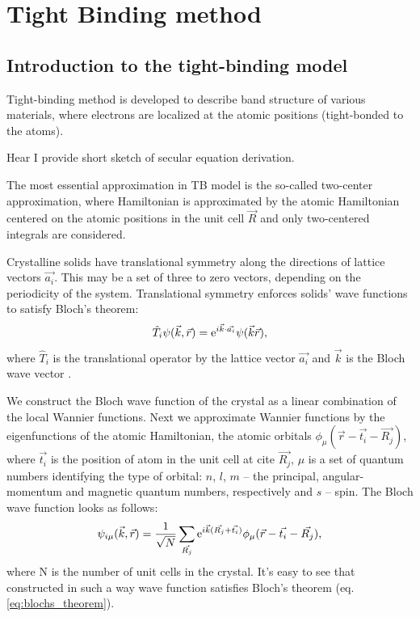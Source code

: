 \chapter{Tight Binding method}
\label{ch:theory}
\section{Introduction to the tight-binding model} \label{sec:TB_theory}
Tight-binding method is developed to describe band structure of various materials, where electrons are localized at the atomic positions (tight-bonded to the atoms). 

Hear I provide short sketch of secular equation derivation.

The most essential approximation in TB model is the so-called two-center approximation, where Hamiltonian is approximated by the atomic Hamiltonian centered on the atomic positions in the unit cell $\vec{R}$ and only two-centered integrals are considered.

Crystalline solids have translational symmetry along the directions of lattice vectors $\vec{a_i}$. This may be a set of three to zero vectors, depending on the periodicity of the system. Translational symmetry enforces solids' wave functions to satisfy Bloch's theorem:
\begin{equation} \label{eq:blochs_theorem}
	\hat{T}_i \psi(\vec{k},\vec{r}) = \mathrm{e}^{i \vec{k} \cdot \vec{a_i}} \psi(\vec{k}\vec{r}),
\end{equation}
where $\hat{T}_i$ is the translational operator by the lattice vector $\vec{a_i}$ and $\vec{k}$ is the Bloch wave vector \cite{kittel}.

We construct the Bloch wave function of the crystal as a linear combination of the local Wannier functions. Next we approximate Wannier functions by the eigenfunctions of the atomic Hamiltonian, the atomic orbitals $\phi_{\mu}(\vec{r} - \vec{t_i} - \vec{R_j})$, where $\vec{t_i}$ is the position of atom in the unit cell at cite $\vec{R_j}$, $\mu$ is a set of quantum numbers identifying the type of orbital: $n$, $l$, $m$ -- the principal, angular-momentum and magnetic quantum numbers, respectively and $s$ -- spin. The Bloch wave function looks as follows:
\begin{equation} \label{eq:wave_fun}
	\psi_{i \mu}(\vec{k},\vec{r}) = \frac{1}{\sqrt{N}} \sum_{\vec{R_j}} \mathrm{e}^{i\vec{k}(\vec{R_j} + \vec{t_i})} \phi_{\mu} (\vec{r} - \vec{t_i} - \vec{R_j}),
\end{equation}
where N is the number of unit cells in the crystal. It's easy to see that constructed in such a way wave function satisfies Bloch's theorem (eq. \ref{eq:blochs_theorem}).

